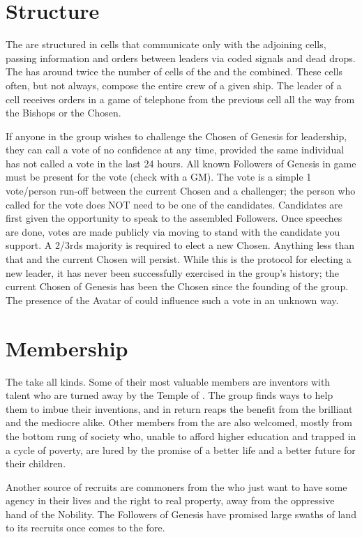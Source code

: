 \documentclass[blue]{GL2020}
\begin{document}
\section*{Structure}
The \pGoaties{} are structured in cells that communicate only with the adjoining cells, passing information and orders between leaders via coded signals and dead drops. The \pShip{} has around twice the number of cells of the \pTech{} and the \pFarm{} combined. These cells often, but not always, compose the entire crew of a given ship. The leader of a cell receives orders in a game of telephone from the previous cell all the way from the Bishops or the Chosen.

If anyone in the group wishes to challenge the Chosen of Genesis for leadership, they can call a vote of no confidence at any time, provided the same individual has not called a vote in the last 24 hours. All known Followers of Genesis in game must be present for the vote (check with a GM). The vote is a simple 1 vote/person run-off between the current Chosen and a challenger; the person who called for the vote does NOT need to be one of the candidates. Candidates are first given the opportunity to speak to the assembled Followers. Once speeches are done, votes are made publicly via moving to stand with the candidate you support. A 2/3rds majority is required to elect a new Chosen. Anything less than that and the current Chosen will persist. While this is the protocol for electing a new leader, it has never been successfully exercised in the group's history; the current Chosen of Genesis has been the Chosen since the founding of the group. The presence of the Avatar of \cGenesis{} could influence such a vote in an unknown way.

\section*{Membership}
The \pGoaties{} take all kinds. Some of their most valuable members are \pTech{} inventors with talent who are turned away by the Temple of \cTechGod{}. The group finds ways to help them to imbue their inventions, and in return reaps the benefit from the brilliant and the mediocre alike. Other members from the \pTech{} are also welcomed, mostly from the bottom rung of society who, unable to afford higher education and trapped in a cycle of poverty, are lured by the promise of a better life and a better future for their children.

Another source of recruits are commoners from the \pFarm{} who just want to have some agency in their lives and the right to real property, away from the oppressive hand of the Nobility. The Followers of Genesis have promised large swaths of land to its \pFarm{} recruits once \cGenesis{} comes to the fore.
\end{document}
